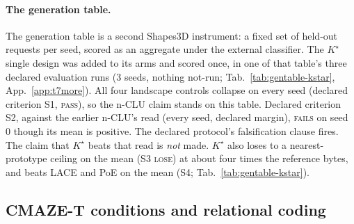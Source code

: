 \documentclass{article} %
\newcommand{\Kstar}{\ensuremath{K^{\star}}}
\begin{document}
\paragraph{The generation table.}
The generation table is a second Shapes3D instrument: a fixed set of %
held-out requests per seed, scored as an aggregate under the external classifier. The $\Kstar$ single design was added
to its arms and scored once, in one of that table's three declared evaluation runs (3 seeds,
nothing not-run; Tab.~\ref{tab:gentable-kstar}, %
App.~\ref{app:t7more}). All four landscape controls collapse on every seed (declared criterion S1, %
\textsc{pass}), so the n-CLU claim stands on this table. Declared criterion S2, against the earlier
n-CLU's read (every seed, declared margin), \textsc{fails} on seed 0 though its mean is positive. The %
declared protocol's falsification clause fires. The claim that $\Kstar$ beats that read is
\emph{not} made. $\Kstar$ also loses to a nearest-prototype ceiling on the mean %
(S3 \textsc{lose}) at about four times the reference bytes, and beats LACE %
and PoE on the mean (S4; Tab.~\ref{tab:gentable-kstar}). %

\subsection{CMAZE-T conditions and relational coding}
\label{sec:maze-wm}

\end{document}
